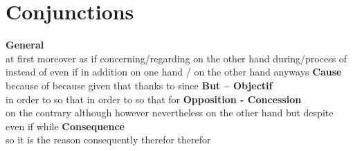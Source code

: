 \section{Conjunctions}
  {\sffamily\bfseries General}\\
     {at first}
    {moreover}
    {as if}
     {concerning/regarding}
     {on the other hand}
     {during/process of}
     {instead of}
     {even if}
     {in addition}
     {on one hand / on the other hand}
     {anyways}
{\sffamily\bfseries Cause}\\
   {because of}
   {because}
   {given that}
   {thanks to}
   {since}
{\sffamily\bfseries But -- Objectif}\\
   {in order to}
   {so that}
   {in order to}
   {so that}
   {for}
{\sffamily\bfseries Opposition - Concession}\\
   {on the contrary}
   {although}
   {however}
   {nevertheless}
   {on the other hand}
   {but}
   {despite}
   {even if}
   {while}
{\sffamily\bfseries Consequence}\\
   {so}
   {it is the reason}
   {}
   {consequently}
   {therefor}
   {therefor}
